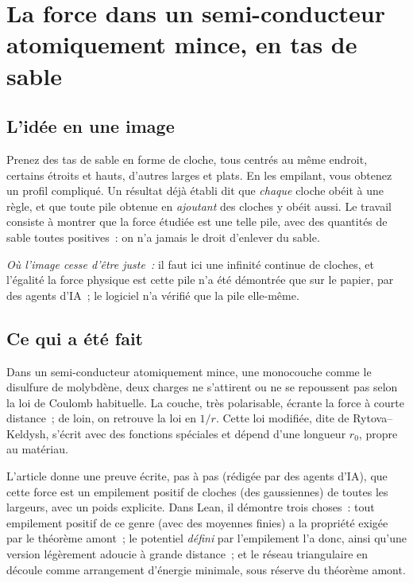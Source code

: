 \chapter[Une force en tas de sable]{La force dans un semi-conducteur atomiquement mince, en tas de sable}

\section*{L'idée en une image}

\begin{analogie}
Prenez des tas de sable en forme de cloche, tous centrés au même endroit, certains étroits et hauts, d'autres larges
et plats. En les empilant, vous obtenez un profil compliqué. Un résultat déjà établi dit que \emph{chaque} cloche
obéit à une règle, et que toute pile obtenue en \emph{ajoutant} des cloches y obéit aussi. Le travail consiste à
montrer que la force étudiée est une telle pile, avec des quantités de sable toutes positives~: on n'a jamais le
droit d'\og enlever\fg{} du sable.

\emph{Où l'image cesse d'être juste~:} il faut ici une infinité continue de cloches, et l'égalité \og la force
physique est cette pile\fg{} n'a été démontrée que sur le papier, par des agents d'IA~; le logiciel n'a vérifié que la pile elle-même.
\end{analogie}

\section*{Ce qui a été fait}

Dans un semi-conducteur atomiquement mince, une monocouche comme le disulfure de molybdène, deux charges ne
s'attirent ou ne se repoussent pas selon la loi de Coulomb habituelle. La couche, très polarisable, écrante la force
à courte distance~; de loin, on retrouve la loi en $1/r$. Cette loi modifiée, dite de Rytova--Keldysh, s'écrit avec
des fonctions spéciales et dépend d'une longueur $r_0$, propre au matériau.

L'article donne une preuve écrite, pas à pas (rédigée par des agents d'IA), que cette force est un empilement positif de cloches (des
gaussiennes) de toutes les largeurs, avec un poids explicite. Dans Lean, il démontre trois choses~: tout empilement
positif de ce genre (avec des moyennes finies) a la propriété exigée par le théorème amont~; le potentiel
\emph{défini} par l'empilement l'a donc, ainsi qu'une version légèrement adoucie à grande distance~; et le réseau
triangulaire en découle comme arrangement d'énergie minimale, sous réserve du théorème amont.

